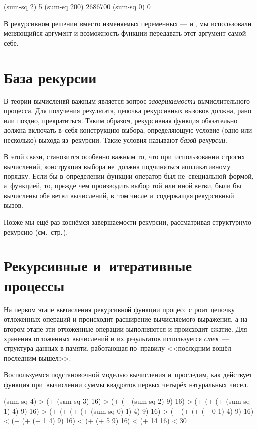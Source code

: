 \REPL
  {(sum-sq 2)}
  {5}
\REPL
  {(sum-sq 200)}
  {2686700}
\REPL
  {(sum-sq 0)}
  {0}

В рекурсивном решении вместо изменяемых переменных ---  и , мы использовали меняющийся аргумент  и возможность функции передавать этот аргумент самой себе.


\section[2]{База рекурсии}%
В теории вычислений важным является вопрос \emph{завершаемости} вычислительного процесса. Для получения результата, цепочка рекурсивных вызовов должна, рано или поздно, прекратиться. Таким образом, рекурсивная функция обязательно должна включать в~себя конструкцию выбора, определяющую условие (одно или несколько) выхода из~рекурсии. Такие условия называют \emph{базой рекурсии}.

В этой связи, становится особенно важным то, что при~использовании строгих вычислений, конструкция выбора не~должна подчиняться аппликативному порядку. Если бы в~определении функции  оператор  был не~специальной формой, а~функцией, то, прежде чем производить выбор той или иной ветви, были бы вычислены обе ветви вычислений, в~том числе и~содержащая рекурсивный вызов.

Позже мы ещё раз коснёмся завершаемости рекурсии, рассматривая структурную рекурсию (см.~стр.\,\pageref{struct-recursion}).

\section[4]{Рекурсивные и~итеративные процессы}\label{iterations}%
На первом этапе вычисления рекурсивной функции процесс строит цепочку отложенных операций и происходит расширение вычисляемого выражения, а на втором этапе эти отложенные операции выполняются и происходит сжатие. Для хранения отложенных вычислений и их результатов используется \emph{стек}~--- структура данных в памяти, работающая по~правилу <<последним вошёл~--- последним вышел>>.

Воспользуемся подстановочной моделью вычисления и~проследим, как действует функция  при~вычислении суммы квадратов первых четырёх натуральных чисел.
\begin{SchemeCode}
  (sum-sq 4)                          > 
  (+ (sum-sq 3) 16)                   > %
  (+ (+ (sum-sq 2) 9) 16)             > %
  (+ (+ (+ (sum-sq 1) 4) 9) 16)       > 
  (+ (+ (+ (+ (sum-sq 0) 1) 4) 9) 16) > %
  (+ (+ (+ (+ 0 1) 4) 9) 16)          < 
  (+ (+ (+ 1 4) 9) 16)                < %
  (+ (+ 5 9) 16)                      < %
  (+ 14 16)                           <
  30
\end{SchemeCode}

